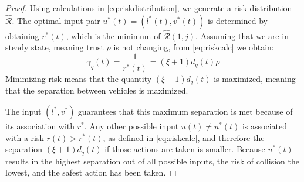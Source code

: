 \documentclass[letterpaper, 10 pt, conference]{ieeeconf}  %
\begin{document}
\begin{proof}
Using calculations in \eqref{eq:riskdistribution}, we generate a risk distribution $\hat{\mathcal{R}}$. The optimal input pair $u^*(t)=(l^*(t),v^*(t))$ is determined by obtaining $r^*(t)$, which is the minimum of $\hat{\mathcal{R}}(1,j)$. Assuming that we are in steady state, meaning trust $\rho$ is not changing, from \eqref{eq:riskcalc} we obtain:
\begin{equation}
\gamma_q(t) = \frac{1}{r^*(t)}=(\xi+1) d_q(t) \rho
\end{equation}
Minimizing risk means that the quantity $(\xi+1)d_q(t)$ is maximized, meaning that the separation between vehicles is maximized.

The input $(l^*,v^*)$ guarantees that this maximum separation is met because of its association with $r^*$. Any other possible input $u(t) \neq u^*(t)$ is associated with a risk $r(t)>r^*(t)$, as defined in \eqref{eq:riskcalc}, and therefore the separation $(\xi+1)d_q(t)$ if those actions are taken is smaller. Because $u^*(t)$ results in the highest separation out of all possible inputs, the risk of collision the lowest, and the safest action has been taken.

\end{proof}
\end{document}
